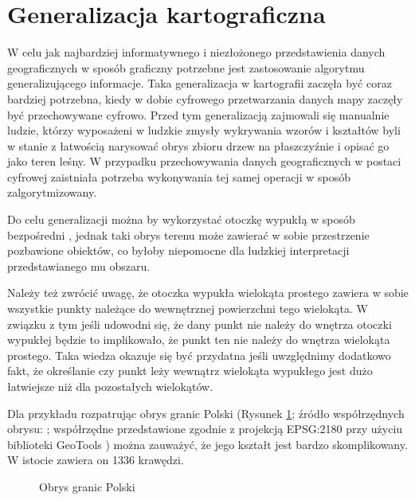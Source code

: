         \section{Generalizacja kartograficzna}
        W celu jak najbardziej informatywnego i niezłożonego przedstawienia danych geograficznych w sposób graficzny potrzebne jest zastosowanie algorytmu generalizującego informacje. Taka generalizacja w kartografii zaczęła być coraz bardziej potrzebna, kiedy w dobie cyfrowego przetwarzania danych mapy zaczęły być przechowywane cyfrowo. Przed tym generalizacją zajmowali się manualnie ludzie, którzy wyposażeni w ludzkie zmysły wykrywania wzorów i kształtów byli w stanie z łatwością narysować obrys zbioru drzew na płaszczyźnie i opisać go jako teren leśny. W przypadku przechowywania danych geograficznych w postaci cyfrowej zaistniała potrzeba wykonywania tej samej operacji w sposób zalgorytmizowany. \cite{cartography}
        
        Do celu generalizacji można by wykorzystać otoczkę wypukłą w sposób bezpośredni \cite{LAURINI2017139}, jednak taki obrys terenu może zawierać w sobie przestrzenie pozbawione obiektów, co byłoby niepomocne dla ludzkiej interpretacji przedstawianego mu obszaru. 
        
        Należy też zwrócić uwagę, że otoczka wypukła wielokąta prostego zawiera w sobie wszystkie punkty należące do wewnętrznej powierzchni tego wielokąta. \cite{convexhullsimplepolygon} W związku z tym jeśli udowodni się, że dany punkt nie należy do wnętrza otoczki wypukłej będzie to implikowało, że punkt ten nie należy do wnętrza wielokąta prostego. Taka wiedza okazuje się być przydatna jeśli uwzględnimy dodatkowo fakt, że określanie czy punkt leży wewnątrz wielokąta wypukłego jest dużo łatwiejsze niż dla pozostałych wielokątów. \cite{heckbert1994graphics}
        
        Dla przykładu rozpatrując obrys granic Polski (Rysunek \ref{fig:poland}; źródło współrzędnych obrysu: \cite{datahubCountryPolygons}; współrzędne przedstawione zgodnie z projekcją EPSG:2180 \cite{epsg2180} przy użyciu biblioteki GeoTools \cite{geotools}) można zauważyć, że jego kształt jest bardzo skomplikowany. W istocie zawiera on 1336 krawędzi.
        \begin{figure}[h!]
        	\begin{center}
    			
    			\caption{Obrys granic Polski}\label{fig:poland}
    	    \end{center}
    	   	\mysource 
    	\end{figure}
    	
